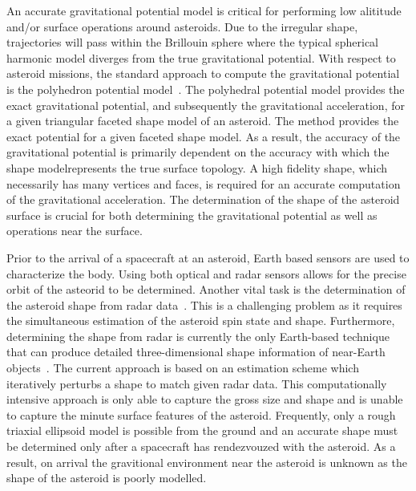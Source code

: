 \documentclass[letterpaper, paper,11pt]{AAS}		%
\begin{document}
An accurate gravitational potential model is critical for performing low alititude and/or surface operations around asteroids.
Due to the irregular shape, trajectories will pass within the Brillouin sphere where the typical spherical harmonic model diverges from the true gravitational potential.
With respect to asteroid missions, the standard approach to compute the gravitational potential is the polyhedron potential model~\cite{werner1996}.
The polyhedral potential model provides the exact gravitational potential, and subsequently the gravitational acceleration, for a given triangular faceted shape model of an asteroid.
The method provides the exact potential for a given faceted shape model.
As a result, the accuracy of the gravitational potential is primarily dependent on the accuracy with which the shape modelrepresents the true surface topology.
A high fidelity shape, which necessarily has many vertices and faces, is required for an accurate computation of the gravitational acceleration.
The determination of the shape of the asteroid surface is crucial for both determining the gravitational potential as well as operations near the surface.

Prior to the arrival of a spacecraft at an asteroid, Earth based sensors are used to characterize the body.
Using both optical and radar sensors allows for the precise orbit of the asteorid to be determined.
Another vital task is the determination of the asteroid shape from radar data~\cite{hudson1994,busch2011}.
This is a challenging problem as it requires the simultaneous estimation of the asteroid spin state and shape.
Furthermore, determining the shape from radar is currently the only Earth-based technique that can produce detailed three-dimensional shape information of near-Earth objects~\cite{greenberg2015}.
The current approach is based on an estimation scheme which iteratively perturbs a shape to match given radar data.
This computationally intensive approach is only able to capture the gross size and shape and is unable to capture the minute surface features of the asteroid.
Frequently, only a rough triaxial ellipsoid model is possible from the ground and an accurate shape must be determined only after a spacecraft has rendezvouzed with the asteroid.
As a result, on arrival the gravitional environment near the asteroid is unknown as the shape of the asteroid is poorly modelled.
\end{document}
